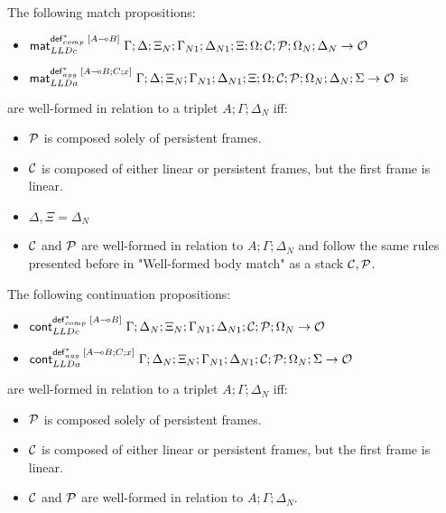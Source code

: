 \begin{definition}
The following match propositions:
\begin{itemize}
   \item $\mathsf{mat}_{LLDc}^{\mathsf{def}_{comp}^{*} \; [A \multimap B]} \; \Gamma; \Delta; \Xi_N; \Gamma_{N1}; \Delta_{N1}; \Xi;
         \Omega; \mathcal{C}; \mathcal{P}; \Omega_N; \Delta_N \rightarrow \mathcal{O}$
   \item $\mathsf{mat}_{LLDa}^{\mathsf{def}_{agg}^{*} \; [A \multimap B ; C; x]} \; \Gamma; \Delta; \Xi_N; \Gamma_{N1}; \Delta_{N1}; \Xi;
      \Omega; \mathcal{C}; \mathcal{P}; \Omega_N; \Delta_N; \Sigma \rightarrow \mathcal{O}$ is
\end{itemize}
are well-formed in relation to a triplet $A; \Gamma; \Delta_{N}$ iff:

\begin{itemize}[leftmargin=*]
   \item $\mathcal{P}$ is composed solely of persistent frames.
   \item $\mathcal{C}$ is composed of either linear or persistent frames, but the first
   frame is linear.
   \item $\Delta, \Xi = \Delta_{N}$
   \item $\mathcal{C}$ and $\mathcal{P}$ are well-formed in relation to $A; \Gamma; \Delta_{N}$ and
   follow the same rules presented before in "Well-formed body match" as a stack
   $\mathcal{C}, \mathcal{P}$.
\end{itemize}
\end{definition}

\begin{definition}
The following continuation propositions:
\begin{itemize}[leftmargin=*]
   \item $\mathsf{cont}_{LLDc}^{\mathsf{def}_{comp}^{*} \; [A \multimap B]} \; \Gamma; \Delta_N; \Xi_N; \Gamma_{N1}; \Delta_{N1}; \mathcal{C}; \mathcal{P}; \Omega_N \rightarrow \mathcal{O}$
   \item $\mathsf{cont}_{LLDa}^{\mathsf{def}_{agg}^{*} \; [A \multimap B ; C; x]} \; \Gamma; \Delta_N; \Xi_N; \Gamma_{N1}; \Delta_{N1}; \mathcal{C}; \mathcal{P}; \Omega_N; \Sigma \rightarrow \mathcal{O}$
\end{itemize}
are well-formed in relation to a triplet $A; \Gamma; \Delta_{N}$ iff:

\begin{itemize}[leftmargin=*]
   \item $\mathcal{P}$ is composed solely of persistent frames.
   \item $\mathcal{C}$ is composed of either linear or persistent frames, but the first
   frame is linear.
   \item $\mathcal{C}$ and $\mathcal{P}$ are well-formed in relation to $A; \Gamma; \Delta_{N}$.
\end{itemize}
\end{definition}

